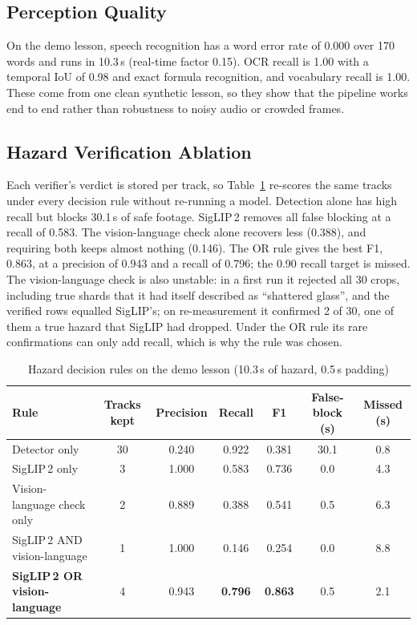 \documentclass[9pt,a4paper]{extarticle}
\newcommand{\tab}[1]{Table~\ref{#1}}
\begin{document}
\subsection{Perception Quality}
On the demo lesson, speech recognition has a word error rate of 0.000 over 170 words and runs in 10.3\,s (real-time
factor 0.15). OCR recall is 1.00 with a temporal IoU of 0.98 and exact formula recognition, and vocabulary recall is
1.00. These come from one clean synthetic lesson, so they show that the pipeline works end to end rather than
robustness to noisy audio or crowded frames.

\subsection{Hazard Verification Ablation}
Each verifier's verdict is stored per track, so \tab{tab:rules} re-scores the same tracks under every decision rule
without re-running a model. Detection alone has high recall but blocks 30.1\,s of safe footage. SigLIP\,2 removes all
false blocking at a recall of 0.583. The vision-language check alone recovers less (0.388), and requiring both keeps
almost nothing (0.146). The OR rule gives the best F1, 0.863, at a precision of 0.943 and a recall of 0.796; the 0.90
recall target is missed. The vision-language check is also unstable: in a first run it rejected all 30 crops, including
true shards that it had itself described as ``shattered glass'', and the verified rows equalled SigLIP's; on
re-measurement it confirmed 2 of 30, one of them a true hazard that SigLIP had dropped. Under the OR rule its rare
confirmations can only add recall, which is why the rule was chosen.

\begin{table}[t]
\caption{Hazard decision rules on the demo lesson (10.3\,s of hazard, 0.5\,s padding)}
\label{tab:rules}
\centering
\begin{tabular}{|l|c|c|c|c|c|c|}
\hline
Rule & Tracks kept & Precision & Recall & F1 & False-block (s) & Missed (s)\\
\hline
Detector only & 30 & 0.240 & 0.922 & 0.381 & 30.1 & 0.8\\
SigLIP\,2 only & 3 & 1.000 & 0.583 & 0.736 & 0.0 & 4.3\\
Vision-language check only & 2 & 0.889 & 0.388 & 0.541 & 0.5 & 6.3\\
SigLIP\,2 AND vision-language & 1 & 1.000 & 0.146 & 0.254 & 0.0 & 8.8\\
\textbf{SigLIP\,2 OR vision-language} & 4 & 0.943 & \textbf{0.796} & \textbf{0.863} & 0.5 & 2.1\\
\hline
\end{tabular}
\end{table}
\end{document}
